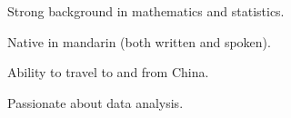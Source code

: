 

\begin{cventries}

  \cventry
    {} %
    {} %
    {} %
    {} %
    {
      \begin{cvitems} %
      \item Strong background in mathematics and statistics.
      \item Native in mandarin (both written and spoken).
      \item Ability to travel to and from China.
      \item Passionate about data analysis. 
      \end{cvitems}
    }


\end{cventries}
